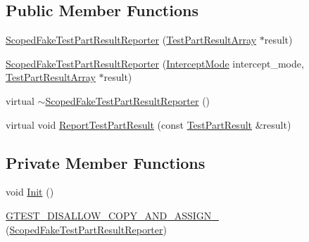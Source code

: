 \subsection*{Public Member Functions}
\begin{DoxyCompactItemize}
\item 
\hyperlink{classtesting_1_1ScopedFakeTestPartResultReporter_aa0100ecf4799fb51d45167be6a5de1d5}{Scoped\+Fake\+Test\+Part\+Result\+Reporter} (\hyperlink{classtesting_1_1TestPartResultArray}{Test\+Part\+Result\+Array} $\ast$result)
\item 
\hyperlink{classtesting_1_1ScopedFakeTestPartResultReporter_a57cbc09ed48627c8a73e622618dc4b4f}{Scoped\+Fake\+Test\+Part\+Result\+Reporter} (\hyperlink{classtesting_1_1ScopedFakeTestPartResultReporter_a82f6209b3cf5c4b15ec8bd8041dbc2d5}{Intercept\+Mode} intercept\+\_\+mode, \hyperlink{classtesting_1_1TestPartResultArray}{Test\+Part\+Result\+Array} $\ast$result)
\item 
virtual \hyperlink{classtesting_1_1ScopedFakeTestPartResultReporter_a4817d59ca70228ebd5d5c3c4e8dd729d}{$\sim$\+Scoped\+Fake\+Test\+Part\+Result\+Reporter} ()
\item 
virtual void \hyperlink{classtesting_1_1ScopedFakeTestPartResultReporter_a82531434f51632d98ed7cdcdb10b8b92}{Report\+Test\+Part\+Result} (const \hyperlink{classtesting_1_1TestPartResult}{Test\+Part\+Result} \&result)
\end{DoxyCompactItemize}
\subsection*{Private Member Functions}
\begin{DoxyCompactItemize}
\item 
void \hyperlink{classtesting_1_1ScopedFakeTestPartResultReporter_a28d280a3f5d172d63b94f70b8e7660d7}{Init} ()
\item 
\hyperlink{classtesting_1_1ScopedFakeTestPartResultReporter_ad7d21ddf4a50ff918571e8a08e73fd59}{G\+T\+E\+S\+T\+\_\+\+D\+I\+S\+A\+L\+L\+O\+W\+\_\+\+C\+O\+P\+Y\+\_\+\+A\+N\+D\+\_\+\+A\+S\+S\+I\+G\+N\+\_\+} (\hyperlink{classtesting_1_1ScopedFakeTestPartResultReporter}{Scoped\+Fake\+Test\+Part\+Result\+Reporter})
\end{DoxyCompactItemize}
